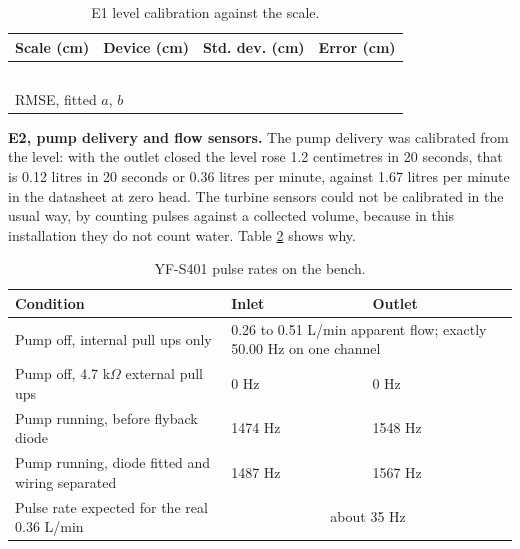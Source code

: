 \begin{table}[H]
\caption{E1 level calibration against the scale.}
\label{tab:calib}
\centering
\renewcommand{\arraystretch}{1.05}
\begin{tabular}{|p{3.0cm}|p{3.0cm}|p{3.0cm}|p{3.0cm}|}
\hline
\rowcolor[HTML]{B7E1F0}
\textbf{Scale (cm)} & \textbf{Device (cm)} & \textbf{Std. dev. (cm)} & \textbf{Error (cm)} \\
\hline
 & & & \\ \hline
 & & & \\ \hline
 & & & \\ \hline
 & & & \\ \hline
 & & & \\ \hline
\multicolumn{2}{|l|}{RMSE, fitted $a$, $b$} & \multicolumn{2}{l|}{} \\ \hline
\end{tabular}
\end{table}

\textbf{E2, pump delivery and flow sensors.} The pump delivery was calibrated from the level: with the outlet closed the level rose 1.2 centimetres in 20 seconds, that is 0.12 litres in 20 seconds or 0.36 litres per minute, against 1.67 litres per minute in the datasheet at zero head. The turbine sensors could not be calibrated in the usual way, by counting pulses against a collected volume, because in this installation they do not count water. Table \ref{tab:flownoise} shows why.

\begin{table}[H]
\caption{YF-S401 pulse rates on the bench.}
\label{tab:flownoise}
\centering
\renewcommand{\arraystretch}{1.05}
\begin{tabular}{|p{6.4cm}|p{3.0cm}|p{3.0cm}|}
\hline
\rowcolor[HTML]{B7E1F0}
\textbf{Condition} & \textbf{Inlet} & \textbf{Outlet} \\
\hline
Pump off, internal pull ups only & \multicolumn{2}{p{6.0cm}|}{0.26 to 0.51 L/min apparent flow; exactly 50.00 Hz on one channel} \\ \hline
Pump off, 4.7 k$\Omega$ external pull ups & 0 Hz & 0 Hz \\ \hline
Pump running, before flyback diode & 1474 Hz & 1548 Hz \\ \hline
Pump running, diode fitted and wiring separated & 1487 Hz & 1567 Hz \\ \hline
Pulse rate expected for the real 0.36 L/min & \multicolumn{2}{c|}{about 35 Hz} \\ \hline
\end{tabular}
\end{table}

